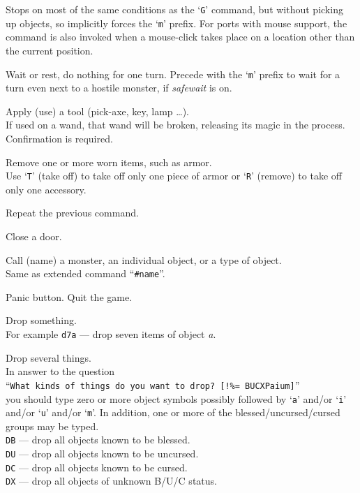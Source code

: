 \documentclass[titlepage]{article}
\begin{document}
\begin{description}[font=\mdseries\ttfamily]
Stops on most of
the same conditions as the `\texttt{G}' command, but without picking up
objects, so implicitly forces the `\texttt{m}' prefix.
For ports with mouse
support, the command is also invoked when a mouse-click takes place on a
location other than the current position.
\item[.]
Wait or rest, do nothing for one turn.
Precede with the `\texttt{m}' prefix
to wait for a turn even next to a hostile monster, if \textit{safe\textunderscore wait}
is on.
\item[a]
Apply (use) a tool (pick-axe, key, lamp \ldots).\\
If used on a wand, that wand will be broken, releasing its magic in the
process.
Confirmation is required.
\item[A]
Remove one or more worn items, such as armor.\\
Use `\texttt{T}' (take off) to take off only one piece of armor
or `\texttt{R}' (remove) to take off only one accessory.
\item[\textasciicircum A]
Repeat the previous command.
\item[c]
Close a door.
\item[C]
Call (name) a monster, an individual object, or a type of object.\\
Same as extended command ``\texttt{\#name}''.
\item[\textasciicircum C]
Panic button.  Quit the game.
\item[d]
Drop something.\\
For example \texttt{d7a} --- drop seven items of object
\textit{a}.
\item[D]
Drop several things.\\
In answer to the question\\
``\texttt{What kinds of things do you want to drop? [!\%= BUCXPaium]}''\\
you should type zero or more object symbols possibly followed by
`\texttt{a}' and/or `\texttt{i}' and/or `\texttt{u}' and/or `\texttt{m}'.
In addition, one or more of
the bless\-ed/\-un\-curs\-ed/\-curs\-ed groups may be typed.\\
\texttt{DB}  --- drop all objects known to be blessed.\\
\texttt{DU}  --- drop all objects known to be uncursed.\\
\texttt{DC}  --- drop all objects known to be cursed.\\
\texttt{DX}  --- drop all objects of unknown B/U/C status.\\

\end{description}
\end{document}
